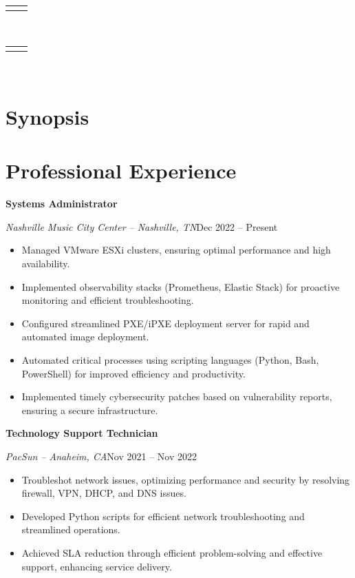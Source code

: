 \documentclass[a4paper]{article}
\makeatletter
\renewcommand{\maketitle}{
  \begin{widebox}
    {\bfseries\LARGE\textsf\theauthor} \\
    \medskip{}
    \begin{tabular}{@{}c|c@{}}
        \faIcon{linkedin} \textsf{\applinkedinurl{}} & \faIcon{github} \textsf{\appgithuburl{}}
    \end{tabular} \\
    \begin{tabular}{@{}c|c@{}}
        \faIcon{mobile} \textsf{\appcellphone{}} & \faIcon{envelope} \textsf{\appemail{}}
    \end{tabular} \\
    \medskip{}
    \faIcon{home} \textsf{\appaddress{}}
  \end{widebox}
}
\makeatother
\begin{document}
\author{\textsf{\appfirstname{} \applastname{}}}

\maketitle

\section{Synopsis}

\begin{center}
    \appsynopsis{}
\end{center}

\section{Professional Experience}
\textbf{Systems Administrator}\par
\textit{Nashville Music City Center -- Nashville, TN}\hfill Dec 2022 -- Present

\begin{itemize}[noitemsep,nolistsep]
    \item Managed VMware ESXi clusters, ensuring optimal performance and high availability.
    \item Implemented observability stacks (Prometheus, Elastic Stack) for proactive monitoring and efficient troubleshooting.
    \item Configured streamlined PXE/iPXE deployment server for rapid and automated image deployment.
    \item Automated critical processes using scripting languages (Python, Bash, PowerShell) for improved efficiency and productivity.
    \item Implemented timely cybersecurity patches based on vulnerability reports, ensuring a secure infrastructure.
\end{itemize}

\vspace{0.5em}
\textbf{Technology Support Technician}\par
\textit{PacSun -- Anaheim, CA}\hfill Nov 2021 -- Nov 2022

\begin{itemize}[noitemsep,nolistsep]
    \item Troubleshot network issues, optimizing performance and security by resolving firewall, VPN, DHCP, and DNS issues.
    \item Developed Python scripts for efficient network troubleshooting and streamlined operations.
    \item Achieved SLA reduction through efficient problem-solving and effective support, enhancing service delivery.
\end{itemize}
\end{document}
